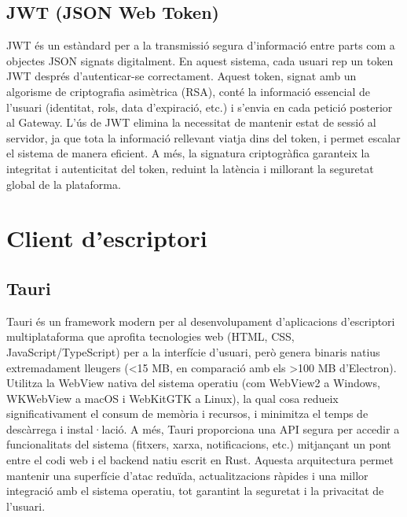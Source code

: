 \subsection*{JWT (JSON Web Token)}
JWT és un estàndard per a la transmissió segura d'informació entre parts com a objectes JSON signats digitalment. En aquest sistema, cada usuari rep un token JWT després d'autenticar-se correctament. Aquest token, signat amb un algorisme de criptografia asimètrica (RSA), conté la informació essencial de l'usuari (identitat, rols, data d'expiració, etc.) i s'envia en cada petició posterior al Gateway. L'ús de JWT elimina la necessitat de mantenir estat de sessió al servidor, ja que tota la informació rellevant viatja dins del token, i permet escalar el sistema de manera eficient. A més, la signatura criptogràfica garanteix la integritat i autenticitat del token, reduint la latència i millorant la seguretat global de la plataforma.

\section{Client d'escriptori}

\subsection*{Tauri}
Tauri és un framework modern per al desenvolupament d'aplicacions d'escriptori multiplataforma que aprofita tecnologies web (HTML, CSS, JavaScript/TypeScript) per a la interfície d'usuari, però genera binaris natius extremadament lleugers (\textless{}15 MB, en comparació amb els \textgreater{}100 MB d'Electron). Utilitza la WebView nativa del sistema operatiu (com WebView2 a Windows, WKWebView a macOS i WebKitGTK a Linux), la qual cosa redueix significativament el consum de memòria i recursos, i minimitza el temps de descàrrega i instal·lació. A més, Tauri proporciona una API segura per accedir a funcionalitats del sistema (fitxers, xarxa, notificacions, etc.) mitjançant un pont entre el codi web i el backend natiu escrit en Rust. Aquesta arquitectura permet mantenir una superfície d'atac reduïda, actualitzacions ràpides i una millor integració amb el sistema operatiu, tot garantint la seguretat i la privacitat de l'usuari.

